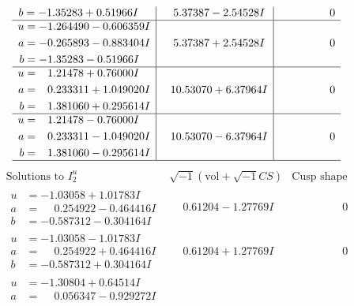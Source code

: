 \documentclass[1p]{elsarticle_modified}
\theoremstyle{definition}
\newcommand{\I}{\sqrt{-1}}
\begin{document}
$$\begin{array}{c|c|c}
\begin{aligned}
b &= -1.35283 + 0.51966 I\end{aligned}
 & \phantom{-}5.37387 - 2.54528 I & \phantom{-0.000000 } 0 \\ \hline\begin{aligned}
u &= -1.264490 - 0.606359 I \\
a &= -0.265893 - 0.883404 I \\
b &= -1.35283 - 0.51966 I\end{aligned}
 & \phantom{-}5.37387 + 2.54528 I & \phantom{-0.000000 } 0 \\ \hline\begin{aligned}
u &= \phantom{-}1.21478 + 0.76000 I \\
a &= \phantom{-}0.233311 + 1.049020 I \\
b &= \phantom{-}1.381060 + 0.295614 I\end{aligned}
 & \phantom{-}10.53070 + 6.37964 I & \phantom{-0.000000 } 0 \\ \hline\begin{aligned}
u &= \phantom{-}1.21478 - 0.76000 I \\
a &= \phantom{-}0.233311 - 1.049020 I \\
b &= \phantom{-}1.381060 - 0.295614 I\end{aligned}
 & \phantom{-}10.53070 - 6.37964 I & \phantom{-0.000000 } 0\\
 \hline 
 \end{array}$$\newpage$$\begin{array}{c|c|c}  
\text{Solutions to }I^u_{2}& \I (\text{vol} + \sqrt{-1}CS) & \text{Cusp shape}\\
 \hline 
\begin{aligned}
u &= -1.03058 + 1.01783 I \\
a &= \phantom{-}0.254922 - 0.464416 I \\
b &= -0.587312 - 0.304164 I\end{aligned}
 & \phantom{-}0.61204 - 1.27769 I & \phantom{-0.000000 } 0 \\ \hline\begin{aligned}
u &= -1.03058 - 1.01783 I \\
a &= \phantom{-}0.254922 + 0.464416 I \\
b &= -0.587312 + 0.304164 I\end{aligned}
 & \phantom{-}0.61204 + 1.27769 I & \phantom{-0.000000 } 0 \\ \hline\begin{aligned}
u &= -1.30804 + 0.64514 I \\
a &= \phantom{-}0.056347 - 0.929272 I \\

\end{aligned}
\end{array}$$
\end{document}
